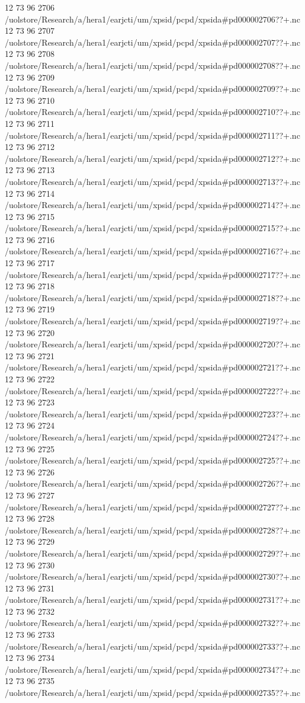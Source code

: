 12 73 96
2706
/uolstore/Research/a/hera1/earjcti/um/xpsid/pcpd/xpsida#pd000002706??+.nc
12 73 96
2707
/uolstore/Research/a/hera1/earjcti/um/xpsid/pcpd/xpsida#pd000002707??+.nc
12 73 96
2708
/uolstore/Research/a/hera1/earjcti/um/xpsid/pcpd/xpsida#pd000002708??+.nc
12 73 96
2709
/uolstore/Research/a/hera1/earjcti/um/xpsid/pcpd/xpsida#pd000002709??+.nc
12 73 96
2710
/uolstore/Research/a/hera1/earjcti/um/xpsid/pcpd/xpsida#pd000002710??+.nc
12 73 96
2711
/uolstore/Research/a/hera1/earjcti/um/xpsid/pcpd/xpsida#pd000002711??+.nc
12 73 96
2712
/uolstore/Research/a/hera1/earjcti/um/xpsid/pcpd/xpsida#pd000002712??+.nc
12 73 96
2713
/uolstore/Research/a/hera1/earjcti/um/xpsid/pcpd/xpsida#pd000002713??+.nc
12 73 96
2714
/uolstore/Research/a/hera1/earjcti/um/xpsid/pcpd/xpsida#pd000002714??+.nc
12 73 96
2715
/uolstore/Research/a/hera1/earjcti/um/xpsid/pcpd/xpsida#pd000002715??+.nc
12 73 96
2716
/uolstore/Research/a/hera1/earjcti/um/xpsid/pcpd/xpsida#pd000002716??+.nc
12 73 96
2717
/uolstore/Research/a/hera1/earjcti/um/xpsid/pcpd/xpsida#pd000002717??+.nc
12 73 96
2718
/uolstore/Research/a/hera1/earjcti/um/xpsid/pcpd/xpsida#pd000002718??+.nc
12 73 96
2719
/uolstore/Research/a/hera1/earjcti/um/xpsid/pcpd/xpsida#pd000002719??+.nc
12 73 96
2720
/uolstore/Research/a/hera1/earjcti/um/xpsid/pcpd/xpsida#pd000002720??+.nc
12 73 96
2721
/uolstore/Research/a/hera1/earjcti/um/xpsid/pcpd/xpsida#pd000002721??+.nc
12 73 96
2722
/uolstore/Research/a/hera1/earjcti/um/xpsid/pcpd/xpsida#pd000002722??+.nc
12 73 96
2723
/uolstore/Research/a/hera1/earjcti/um/xpsid/pcpd/xpsida#pd000002723??+.nc
12 73 96
2724
/uolstore/Research/a/hera1/earjcti/um/xpsid/pcpd/xpsida#pd000002724??+.nc
12 73 96
2725
/uolstore/Research/a/hera1/earjcti/um/xpsid/pcpd/xpsida#pd000002725??+.nc
12 73 96
2726
/uolstore/Research/a/hera1/earjcti/um/xpsid/pcpd/xpsida#pd000002726??+.nc
12 73 96
2727
/uolstore/Research/a/hera1/earjcti/um/xpsid/pcpd/xpsida#pd000002727??+.nc
12 73 96
2728
/uolstore/Research/a/hera1/earjcti/um/xpsid/pcpd/xpsida#pd000002728??+.nc
12 73 96
2729
/uolstore/Research/a/hera1/earjcti/um/xpsid/pcpd/xpsida#pd000002729??+.nc
12 73 96
2730
/uolstore/Research/a/hera1/earjcti/um/xpsid/pcpd/xpsida#pd000002730??+.nc
12 73 96
2731
/uolstore/Research/a/hera1/earjcti/um/xpsid/pcpd/xpsida#pd000002731??+.nc
12 73 96
2732
/uolstore/Research/a/hera1/earjcti/um/xpsid/pcpd/xpsida#pd000002732??+.nc
12 73 96
2733
/uolstore/Research/a/hera1/earjcti/um/xpsid/pcpd/xpsida#pd000002733??+.nc
12 73 96
2734
/uolstore/Research/a/hera1/earjcti/um/xpsid/pcpd/xpsida#pd000002734??+.nc
12 73 96
2735
/uolstore/Research/a/hera1/earjcti/um/xpsid/pcpd/xpsida#pd000002735??+.nc
